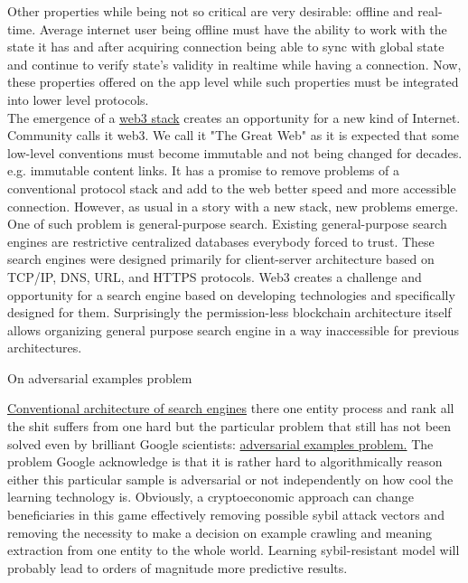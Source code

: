 \documentclass[10pt,oneside]{amsart}
\makeatletter
\def\section{\@startsection{section}{1}%
  \z@{.7\linespacing\@plus\linespacing}{.5\linespacing}%
  {\normalfont\scshape}}%
\makeatother
\begin{document}
 Other properties while being not so critical are very desirable: offline and real-time. Average internet user being offline must have the ability to work with the state it has and after acquiring connection being able to sync with global state and continue to verify state's validity in realtime while having a connection. Now, these properties offered on the app level while such properties must be integrated into lower level protocols.\\

 The emergence of a \href{https://ipfs.io/ipfs/Qmf3eHU9idMUZgx6MKhCsFPWL24X9pDUi2ECqyH8UtBAMQ}{web3 stack} 
 creates an opportunity for a new kind of Internet. Community calls it web3. We call it "The Great Web" as it is expected that some low-level conventions must become immutable and not being changed for decades. e.g. immutable content links. It has a promise to remove problems of a conventional protocol stack and add to the web better speed and more accessible connection. However, as usual in a story with a new stack, new problems emerge. One of such problem is general-purpose search. Existing general-purpose search engines are restrictive centralized databases everybody forced to trust. These search engines were designed primarily for client-server architecture based on TCP/IP, DNS, URL, and HTTPS protocols. Web3 creates a challenge and opportunity for a search engine based on developing technologies and specifically designed for them. Surprisingly the permission-less blockchain architecture itself allows organizing general purpose search engine in a way inaccessible for previous architectures.

\section{On adversarial examples problem}\label{on adversarial examples problem}

\href{https://ipfs.io/ipfs/QmeS4LjoL1iMNRGuyYSx78RAtubTT2bioSGnsvoaupcHR6}{Conventional architecture of search engines} there one entity process and rank all the shit suffers from one hard but the particular problem that still has not been solved even by brilliant Google scientists: \href{https://ipfs.io/ipfs/QmNrAFz34SLqkzhSg4wAYYJeokfJU5hBEpkT4hPRi226y9}{adversarial examples problem.}
The problem Google acknowledge is that it is rather hard to algorithmically reason either this particular sample is adversarial or 
not independently on how cool the learning technology is. Obviously, a cryptoeconomic approach can change beneficiaries in this game effectively removing possible sybil attack vectors and removing the necessity to make a decision on example crawling and meaning extraction from one entity to the whole world. Learning sybil-resistant model will probably lead to orders of magnitude more predictive results.
\end{document}

